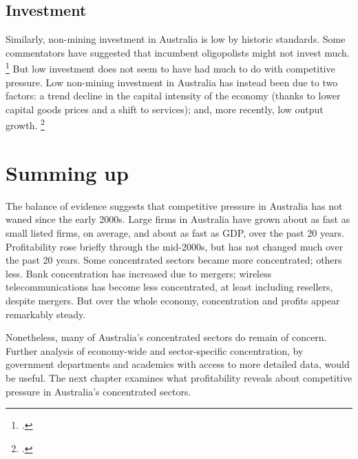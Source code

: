 \subsection{Investment}

Similarly, non-mining investment in Australia is low by historic standards. Some commentators have suggested that incumbent oligopolists might not invest much.%
    \footcite{Econ_probprofits2016}
But low investment does not seem to have had much to do with competitive pressure. Low non-mining investment in Australia has instead been due to two factors: a trend decline in the capital intensity of the economy (thanks to lower capital goods prices and a shift to services); and, more recently, low output growth.%
    \footcite{MinifieChisholmPercival2017}

\section{Summing up}

The balance of evidence suggests that competitive pressure in Australia has not waned since the early 2000s. Large firms in Australia have grown about as fast as small listed firms, on average, and about as fast as GDP, over the past 20 years. Profitability rose briefly through the mid-2000s, but has not changed much over the past 20 years. Some concentrated sectors became more concentrated; others less. Bank concentration has increased due to mergers; wireless telecommunications has become less concentrated, at least including resellers, despite mergers. But over the whole economy, concentration and profits appear remarkably steady.

Nonetheless, many of Australia's concentrated sectors do remain of concern. Further analysis of economy-wide and sector-specific concentration, by government departments and academics with access to more detailed data, would be useful. The next chapter examines what profitability reveals about competitive pressure in Australia's concentrated sectors.



